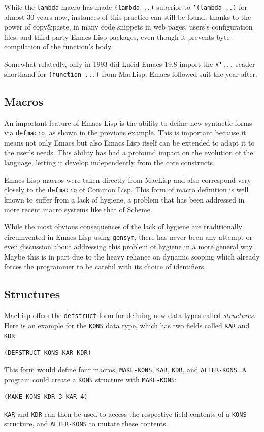 \documentclass[format=acmsmall, review]{acmart}
\newcommand \Elisp {Emacs Lisp}
\begin{document}
While the \texttt{lambda} macro has made \texttt{(lambda ..)} superior to
\texttt{'(lambda ..)} for almost
30 years now, instances of this practice can still be found, thanks to the
power of copy\&paste, in many code snippets in web pages, users's
configuration files, and third party \Elisp{} packages, even though it
prevents byte-compilation of the function's body.

Somewhat relatedly, only in 1993 did Lucid Emacs 19.8 import the
\verb|#'...| reader shorthand for \texttt{(function ...)} from MacLisp.
Emacs followed suit the year after.

\subsection{Macros}
\label{sec:macros}

An important feature of \Elisp{} is the ability to define new syntactic
forms via \texttt{defmacro}, as shown in the previous example.  This is
important because it means not only Emacs but also \Elisp{} itself can be
extended to adapt it to the user's needs.  This ability has had a profound
impact on the evolution of the language, letting it develop independently
from the core constructs.

\Elisp{} macros were taken directly from MacLisp and also correspond very
closely to the \texttt{defmacro} of Common Lisp.  This form of macro
definition is well known to suffer from a lack of hygiene, a problem that
has been addressed in more recent macro systems like that of Scheme.

While the most obvious consequences of the lack of hygiene are traditionally
circumvented in \Elisp{} using \texttt{gensym}, there has never been any
attempt or even discussion about addressing this problem of hygiene in
a more general way.  Maybe this is in part due to the heavy reliance on
dynamic scoping which already forces the programmer to be careful with its
choice of identifiers.

\subsection{Structures}
\label{sec:structures}

MacLisp offers the \texttt{defstruct} form for defining new data
types called \textit{structures}.  Here is an example for the
\texttt{KONS} data type, which has two fields called \texttt{KAR} and \texttt{KDR}:
%
\begin{verbatim}
(DEFSTRUCT KONS KAR KDR)
\end{verbatim}
%
This form would define four macros, \texttt{MAKE-KONS}, \texttt{KAR},
\texttt{KDR}, and \texttt{ALTER-KONS}.  A program could create a
\texttt{KONS} structure with \texttt{MAKE-KONS}:
%
\begin{verbatim}
(MAKE-KONS KDR 3 KAR 4)
\end{verbatim}
%
\texttt{KAR} and \texttt{KDR} can then be used to access the
respective field contents of a \texttt{KONS} structure, and
\texttt{ALTER-KONS} to mutate these contents.
\end{document}
